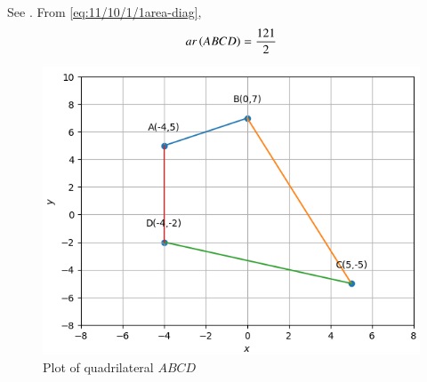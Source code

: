 See .
    From 
        \eqref{eq:11/10/1/1area-diag},
    \begin{align}
ar\left(ABCD\right)
	       = \frac{121}{2}
        \label{eq:11/10/1/1ans}
    \end{align}
    \begin{figure}[!htb]
        \centering
        \includegraphics[width=\columnwidth]{chapters/11/10/1/1/figs/quad.png}
        \caption{Plot of quadrilateral $ABCD$}
        \label{fig:11/10/1/1quad}
    \end{figure}
